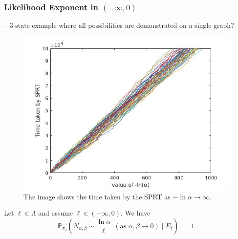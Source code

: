 \documentclass[a4paper,UKenglish,cleveref, autoref,mathscr]{lipics-v2019}
\newcommand{\PP}{\mathbb{P}}
\newcommand{\1}{\mathbbm{1}}
\begin{document}
\subsubsection{Likelihood Exponent in $(-\infty, 0)$}

-- 3 state example where all possibilities are demonstrated on a single graph?



\begin{center}
	\begin{figure}[h]
		\includegraphics[width=\textwidth]{l100000_i50.jpg}	
		\caption{The image shows the time taken by the SPRT as $-\ln \alpha \rightarrow \infty$.}\label{sprttimevslnalpha}
	\end{figure}
\end{center}

\begin{proposition}\label{liexpmotivation}
Let $\ell \in \Lambda$ and assume $\ell \in (-\infty, 0)$. We have 
\begin{equation*}
\PP_{\pi_2}\left( N_{\alpha,\beta} \sim \frac{\ln \alpha}{\ell} \ \ (\text{as } \alpha, \beta \rightarrow 0) \;\Big\vert\; E_{\ell}\right) ~=~ 1.
\end{equation*}
\end{proposition}
\end{document}
